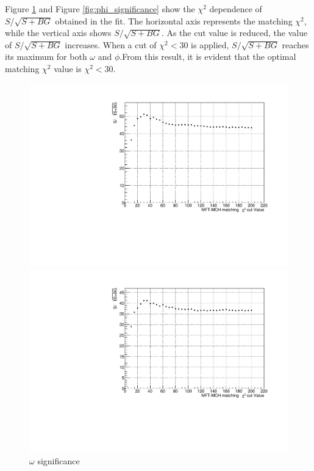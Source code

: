             Figure \ref{fig:omega_significance} and Figure \ref{fig:phi_significance} show the $\chi^2$ dependence of \(S/\sqrt{S+BG}\) obtained in the fit.
            The horizontal axis represents the matching \(\chi^2\), while the vertical axis shows \(S/\sqrt{S+BG}\). As the cut value is reduced, the value of \(S/\sqrt{S+BG}\) increases. When a cut of \(\chi^2<30\) is applied, \(S/\sqrt{S+BG}\) reaches its maximum for both \(\omega\) and \(\phi\).\@ From this result, it is evident that the optimal matching \(\chi^2\) value is \(\chi^2<30\).\@
            \begin{figure}[htbp]
                \centering
                \begin{minipage}{0.45\textwidth} %
                    \centering
                    \includegraphics[width=\textwidth]{fig/3_4_4_omega_significance.pdf} %
                    \caption{$\omega$ significance}
                    \label{fig:omega_significance}
                \end{minipage}
                \hfill
                \begin{minipage}{0.45\textwidth}
                    \centering
                    \includegraphics[width=\textwidth]{fig/3_4_4_phi_significance.pdf} %

\end{minipage}
\end{figure}
